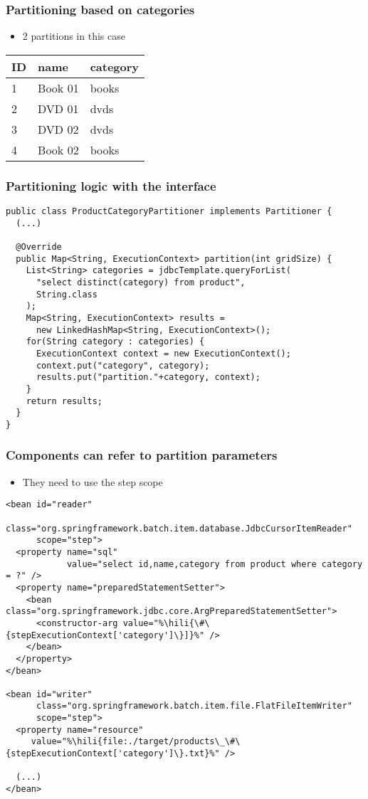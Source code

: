 \begin{frame}
 \frametitle{Partitioning based on categories}
 \begin{itemize}
  \item 2 partitions in this case  
 \end{itemize}
 \begin{center}
 \begin{tabular}{l|l|l}
  \hline
  ID & name & category \\
  \hline
  \rowcolor{cyan}1 & Book 01 & books \\
  \rowcolor{yellow}2 & DVD 01 & dvds \\
  \rowcolor{yellow}3 & DVD 02 & dvds \\
  \rowcolor{cyan}4 & Book 02 & books \\
  \hline
 \end{tabular}
 \end{center}
\end{frame}


\begin{frame}[fragile]
\frametitle{Partitioning logic with the  interface}
\lstset{language=Java}
\begin{lstlisting}
public class ProductCategoryPartitioner implements Partitioner {
  (...)

  @Override
  public Map<String, ExecutionContext> partition(int gridSize) {
    List<String> categories = jdbcTemplate.queryForList(
      "select distinct(category) from product",
      String.class
    );
    Map<String, ExecutionContext> results = 
      new LinkedHashMap<String, ExecutionContext>();
    for(String category : categories) {
      ExecutionContext context = new ExecutionContext();
      context.put("category", category);
      results.put("partition."+category, context);
    } 
    return results;
  }
}
\end{lstlisting}
\end{frame}

\begin{frame}[fragile]
\frametitle{Components can refer to partition parameters}
\begin{itemize}
 \item They need to use the step scope 
\end{itemize}

\lstset{language=XML}
\begin{lstlisting}
<bean id="reader" 
      class="org.springframework.batch.item.database.JdbcCursorItemReader" 
      scope="step">
  <property name="sql" 
            value="select id,name,category from product where category = ?" />
  <property name="preparedStatementSetter">
    <bean class="org.springframework.jdbc.core.ArgPreparedStatementSetter">
      <constructor-arg value="%\hili{\#\{stepExecutionContext['category']\}]}%" />
    </bean>
  </property>
</bean>

<bean id="writer" 
      class="org.springframework.batch.item.file.FlatFileItemWriter" 
      scope="step">
  <property name="resource"
     value="%\hili{file:./target/products\_\#\{stepExecutionContext['category']\}.txt}%" />
 
  (...)
</bean>
\end{lstlisting}
\end{frame}

